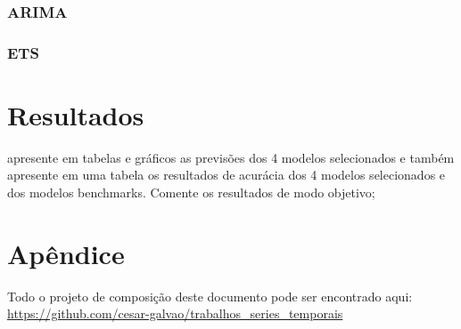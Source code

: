 \documentclass[
  letterpaper,
  DIV=11,
  numbers=noendperiod]{scrartcl}
\begin{document}
\hypertarget{arima}{%
\subsubsection{ARIMA}\label{arima}}

\hypertarget{ets}{%
\subsubsection{ETS}\label{ets}}

\hypertarget{resultados}{%
\section{Resultados}\label{resultados}}

apresente em tabelas e gráficos as previsões dos 4 modelos selecionados
e também apresente em uma tabela os resultados de acurácia dos 4 modelos
selecionados e dos modelos benchmarks. Comente os resultados de modo
objetivo;

\hypertarget{apuxeandice}{%
\section{Apêndice}\label{apuxeandice}}

Todo o projeto de composição deste documento pode ser encontrado aqui:
\url{https://github.com/cesar-galvao/trabalhos_series_temporais}
\end{document}

